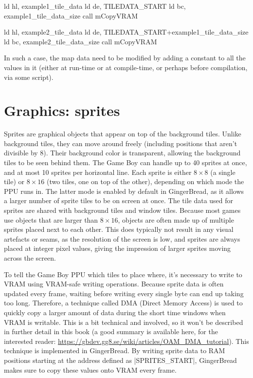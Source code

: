 \documentclass[11pt]{book}
\begin{document}
\begin{code}
ld hl, example1_tile_data
ld de, TILEDATA_START
ld bc, example1_tile_data_size
call mCopyVRAM

ld hl, example2_tile_data
ld de, TILEDATA_START+example1_tile_data_size
ld bc, example2_tile_data_size
call mCopyVRAM
\end{code}

In such a case, the map data need to be modified by adding a constant to all the values in it (either at run-time or at compile-time, or perhaps before compilation, via some script). 

\section{Graphics: sprites}
\label{sprites}
Sprites are graphical objects that appear on top of the background tiles. Unlike background tiles, they can move around freely (including positions that aren't divisible by 8). Their background color is transparent, allowing the background tiles to be seen behind them. The Game Boy can handle up to 40 sprites at once, and at most 10 sprites per horizontal line. Each sprite is either $8\times8$ (a single tile) or $8\times16$ (two tiles, one on top of the other), depending on which mode the PPU runs in. The latter mode is enabled by default in GingerBread, as it allows a larger number of sprite tiles to be on screen at once. The tile data used for sprites are shared with background tiles and window tiles. Because most games use objects that are larger than $8\times16$, objects are often made up of multiple sprites placed next to each other. This does typically not result in any visual artefacts or seams, as the resolution of the screen is low, and sprites are always placed at integer pixel values, giving the impression of larger sprites moving across the screen.

To tell the Game Boy PPU which tiles to place where, it's necessary to write to VRAM using VRAM-safe writing operations. Because sprite data is often updated every frame, waiting before writing every single byte can end up taking too long. Therefore, a technique called DMA (Direct Memory Access) is used to quickly copy a larger amount of data during the short time windows when VRAM is writable. This is a bit technical and involved, so it won’t be described in further detail in this book (a good summary is available here, for the interested reader: \url{https://gbdev.gg8.se/wiki/articles/OAM_DMA_tutorial}). This technique is implemented in GingerBread. By writing sprite data to RAM positions starting at the address defined as |SPRITES_START|, GingerBread makes sure to copy these values onto VRAM every frame.
\end{document}
